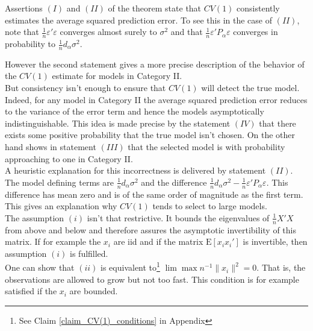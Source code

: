 \documentclass[Research_Module_ES.tex]{subfiles}
\begin{document}
Assertions $(I)$ and $(II)$ of the theorem state that $CV(1)$ consistently estimates the average squared prediction error. To see this in the case of $(II)$, note that $\frac{1}{n}\varepsilon'\varepsilon$ converges almost surely to $\sigma^2$ and that 
$\frac{1}{n}\varepsilon'P_\alpha\varepsilon$ converges in probability to $\frac{1}{n}d_\alpha\sigma^2$.\

However the second statement gives a more precise description of the behavior of the $CV(1)$ estimate for models in Category II. \\

But consistency isn't enough to ensure that $CV(1)$ will detect the true model. 
Indeed, for any model in Category II the average squared prediction error reduces to the variance of the error term and hence the models asymptotically indistinguishable. 
This idea is made precise by the statement $(IV)$ that there exists some positive probability that the true model isn't chosen. On the other hand \cite{shao} shows in statement $(III)$ that the selected model is with probability approaching to one in Category II.\\

A heuristic explanation for this incorrectness is delivered by statement $(II)$. The model defining terms are $\frac{1}{n}d_\alpha\sigma^2$ and the difference $\frac{1}{n}d_\alpha\sigma^2 - \frac{1}{n}\varepsilon'P_\alpha\varepsilon$. This difference has mean zero and is of the same order of magnitude as the first term. This gives an explanation why $CV(1)$ tends to select to large models.\\

The assumption $(i)$ isn't that restrictive. It bounds the eigenvalues of $\frac{1}{n}X'X$ from above and below and therefore assures the asymptotic invertibility of this matrix. If for example the $x_i$ are iid and if the matrix $\mathrm{E}[x_ix_i']$ is invertible, then assumption $(i)$ is fulfilled.\\

One can show that $(ii)$ is equivalent to\footnote{See Claim \ref{claim_CV(1)_conditions} in Appendix } 
$\lim \max n^{-1}\lVert x_i\rVert^2=0$. That is, the observations are allowed to grow but not too fast. This condition is for example satisfied if the $x_i$ are bounded.
\end{document}
